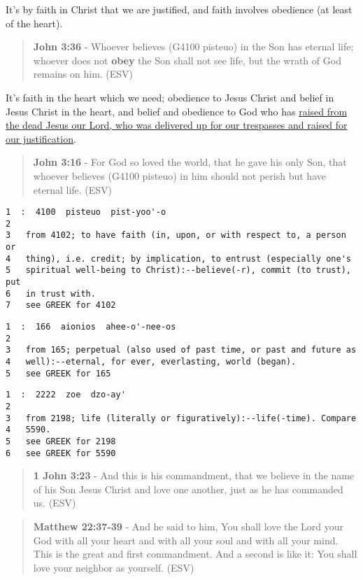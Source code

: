 \documentclass[11pt]{article}
\begin{document}
It's by faith in Christ that we are justified, and faith involves obedience (at least of the heart).

\begin{quote}
\textbf{John 3:36} - Whoever believes (G4100 pisteuo) in the Son has eternal life; whoever does not \textbf{obey} the Son shall not see life, but the wrath of God remains on him. (ESV)
\end{quote}

It's faith in the heart which we need; obedience to Jesus Christ and belief in Jesus Christ in the heart, and belief and obedience to God who has \uline{raised from the dead Jesus our Lord, who was delivered up for our trespasses and raised for our justification}.

\begin{quote}
\textbf{John 3:16} - For God so loved the world, that he gave his only Son, that whoever believes (G4100 pisteuo) in him should not perish but have eternal life. (ESV)
\end{quote}

\begin{verbatim}
1  :  4100  pisteuo  pist-yoo'-o
2  
3   from 4102; to have faith (in, upon, or with respect to, a person or
4   thing), i.e. credit; by implication, to entrust (especially one's
5   spiritual well-being to Christ):--believe(-r), commit (to trust), put
6   in trust with.
7   see GREEK for 4102
\end{verbatim}

\begin{verbatim}
1  :  166  aionios  ahee-o'-nee-os
2  
3   from 165; perpetual (also used of past time, or past and future as
4   well):--eternal, for ever, everlasting, world (began).
5   see GREEK for 165
\end{verbatim}

\begin{verbatim}
1  :  2222  zoe  dzo-ay'
2  
3   from 2198; life (literally or figuratively):--life(-time). Compare
4   5590.
5   see GREEK for 2198
6   see GREEK for 5590
\end{verbatim}

\begin{quote}
\textbf{1 John 3:23} - And this is his commandment, that we believe in the name of his Son Jesus Christ and love one another, just as he has commanded us. (ESV)
\end{quote}

\begin{quote}
\textbf{Matthew 22:37-39} - And he said to him, You shall love the Lord your God with all your heart and with all your soul and with all your mind. This is the great and first commandment. And a second is like it: You shall love your neighbor as yourself. (ESV)
\end{quote}
\end{document}
